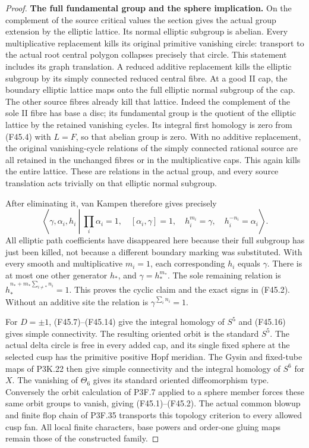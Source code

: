 \begin{proof}
\par\medskip\noindent\textbf{The full fundamental group and the sphere implication.}\enspace
On the complement of the source critical values the section
gives the actual group extension by the elliptic lattice.
Its normal elliptic subgroup is abelian. Every multiplicative
replacement kills its original primitive vanishing circle:
transport to the actual root central polygon collapses precisely
that circle. This statement includes its graph translation.
A reduced additive replacement kills the elliptic subgroup by
its simply connected reduced central fibre. At a good II cap,
the boundary elliptic lattice maps onto the full elliptic
normal subgroup of the cap. The other source fibres already
kill that lattice. Indeed the complement of the sole II fibre
has base a disc; its fundamental group is the quotient of the
elliptic lattice by the retained vanishing cycles. Its integral
first homology is zero from (F45.4) with $L=F$, so that abelian
group is zero. With no additive replacement, the original
vanishing-cycle relations of the simply connected rational
source are all retained in the unchanged fibres or in the
multiplicative caps. This again kills the entire lattice.
These are relations in the actual group, and every source
translation acts trivially on that elliptic normal subgroup.

After eliminating it, van Kampen therefore gives precisely
\[
 \left\langle\gamma,\alpha_i,h_i\ \left|\
 \prod_i\alpha_i=1,\quad [\alpha_i,\gamma]=1,\quad
 h_i^{m_i}=\gamma,\quad h_i^{-n_i}=\alpha_i
                         \right.\right\rangle .       \tag{F45.16}
\]
All elliptic path coefficients have disappeared here because
their full subgroup has just been killed, not because a
different boundary marking was substituted. With every smooth
and multiplicative $m_i=1$, each corresponding $h_i$ equals
$\gamma$. There is at most one other generator $h_*$, and
$\gamma=h_*^{m_*}$. The sole remaining relation is
$h_*^{n_*+m_*\sum_{i\ne *}n_i}=1$. This proves the cyclic
claim and the exact signs in (F45.2). Without an additive site
the relation is $\gamma^{\sum_i n_i}=1$.

For $D=\pm1$, (F45.7)--(F45.14) give the integral homology
of $S^5$ and (F45.16) gives simple connectivity. The resulting
oriented orbit is the standard $S^5$. The actual delta circle
is free in every added cap, and its single fixed sphere at the
selected cusp has the primitive positive Hopf meridian. The
Gysin and fixed-tube maps of P3K.22 then give simple connectivity
and the integral homology of $S^6$ for $X$. The vanishing of
$\Theta_6$ gives its standard oriented diffeomorphism type.
Conversely the orbit calculation of P3F.7 applied to a sphere
member forces these same orbit groups to vanish, giving
(F45.1)--(F45.2). The actual common blowup and finite flop chain
of P3F.35 transports this topology criterion to every allowed
cusp fan. All local finite characters, base powers and
order-one gluing maps remain those of the constructed family.
\end{proof}
